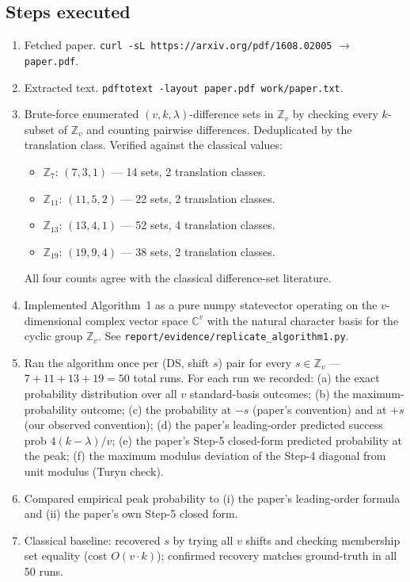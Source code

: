 \documentclass[11pt]{article}
\begin{document}
\subsection{Steps executed}
\begin{enumerate}
\item Fetched paper.  \verb|curl -sL https://arxiv.org/pdf/1608.02005|
      $\rightarrow$ \verb|paper.pdf|.
\item Extracted text.  \verb|pdftotext -layout paper.pdf work/paper.txt|.
\item Brute-force enumerated $(v,k,\lambda)$-difference sets in
      $\mathbb{Z}_v$ by checking every $k$-subset of $\mathbb{Z}_v$ and
      counting pairwise differences.  Deduplicated by the translation
      class.  Verified against the classical values:
      \begin{itemize}
      \item $\mathbb{Z}_7$: $(7,3,1)$ --- 14 sets, 2 translation classes.
      \item $\mathbb{Z}_{11}$: $(11,5,2)$ --- 22 sets, 2 translation
            classes.
      \item $\mathbb{Z}_{13}$: $(13,4,1)$ --- 52 sets, 4 translation
            classes.
      \item $\mathbb{Z}_{19}$: $(19,9,4)$ --- 38 sets, 2 translation
            classes.
      \end{itemize}
      All four counts agree with the classical difference-set literature.
\item Implemented Algorithm~1 as a pure numpy statevector operating on the
      $v$-dimensional complex vector space $\mathbb{C}^v$ with the natural
      character basis for the cyclic group $\mathbb{Z}_v$.  See
      \texttt{report/evidence/replicate\_algorithm1.py}.
\item Ran the algorithm once per (DS, shift $s$) pair for every
      $s\in\mathbb{Z}_v$ --- $7+11+13+19=50$ total runs.  For each run we
      recorded: (a) the exact probability distribution over all $v$
      standard-basis outcomes; (b) the maximum-probability outcome; (c) the
      probability at $-s$ (paper's convention) and at $+s$ (our observed
      convention); (d) the paper's leading-order predicted success prob
      $4(k-\lambda)/v$; (e) the paper's Step-5 closed-form predicted
      probability at the peak; (f) the maximum modulus deviation of the
      Step-4 diagonal from unit modulus (Turyn check).
\item Compared empirical peak probability to (i) the paper's leading-order
      formula and (ii) the paper's own Step-5 closed form.
\item Classical baseline: recovered $s$ by trying all $v$ shifts and
      checking membership set equality (cost $O(v\cdot k)$); confirmed
      recovery matches ground-truth in all 50 runs.
\end{enumerate}
\end{document}
